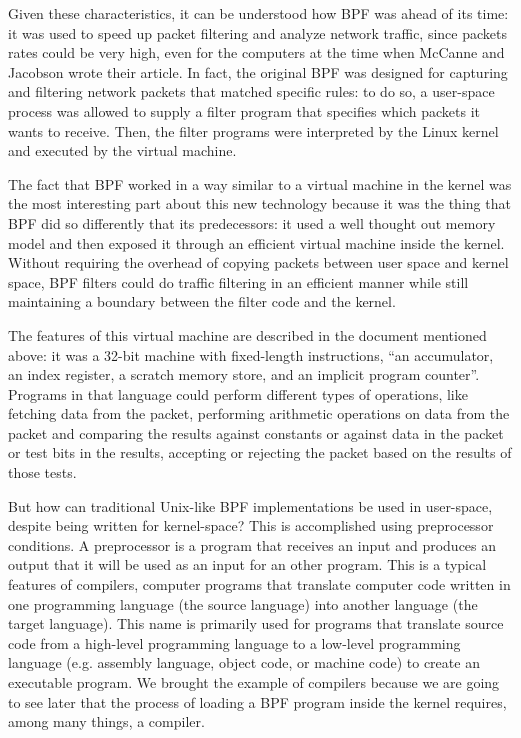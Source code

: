 Given these characteristics, it can be understood how BPF was ahead of its time: it was used to speed up packet filtering and analyze network traffic, since packets rates could be very high, even for the computers at the time when McCanne and Jacobson wrote their article. 
In fact, the original BPF was designed for capturing and filtering network packets that matched specific rules: to do so, a user-space process was allowed to supply a filter program that specifies which packets it wants to receive.
Then, the filter programs were interpreted by the Linux kernel and executed by the virtual machine.

The fact that BPF worked in a way similar to a virtual machine in the kernel was the most interesting part about this new technology because it was the thing that BPF did so differently that its predecessors: it used a well thought out memory model and then exposed it through an efficient virtual machine inside the kernel. 
Without requiring the overhead of copying packets between user space and kernel space, BPF filters could do traffic filtering in an efficient manner while still maintaining a boundary between the filter code and the kernel.

The features of this virtual machine are described in the document mentioned above: it was a 32-bit machine with fixed-length instructions, ``an accumulator, an index register, a scratch memory store, and an implicit program counter''.
Programs in that language could perform different types of operations, like fetching data from the packet, performing arithmetic operations on data from the packet and comparing the results against constants or against data in the packet or test bits in the results, accepting or rejecting the packet based on the results of those tests.

But how can traditional Unix-like BPF implementations be used in user-space, despite being written for kernel-space? 
This is accomplished using preprocessor conditions.
A preprocessor is a program that receives an input and produces an output that it will be used as an input for an other program.
This is a typical features of compilers, computer programs that translate computer code written in one programming language (the source language) into another language (the target language). 
This name is primarily used for programs that translate source code from a high-level programming language to a low-level programming language (e.g. assembly language, object code, or machine code) to create an executable program.
We brought the example of compilers because we are going to see later that the process of loading a BPF program inside the kernel requires, among many things, a compiler.

